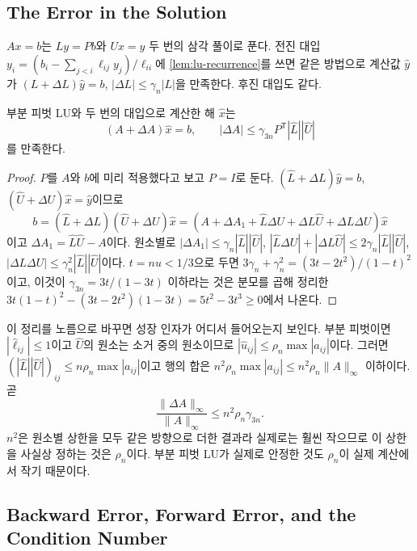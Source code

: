 \subsection{The Error in the Solution}

$Ax=b$는 $Ly=Pb$와 $Ux=y$ 두 번의 삼각 풀이로 푼다. 전진 대입 $y_i=(b_i-\sum_{j<i}\ell_{ij}y_j)/\ell_{ii}$에 \cref{lem:lu-recurrence}를 쓰면 같은 방법으로 계산값 $\hat y$가 $(L+\Delta L)\hat y=b$, $|\Delta L|\le\gamma_n|L|$을 만족한다. 후진 대입도 같다.

\begin{theorem}
\label{thm:lu-solve-backward}
부분 피벗 LU와 두 번의 대입으로 계산한 해 $\hat x$는
\[
(A+\Delta A)\hat x=b,\qquad|\Delta A|\le\gamma_{3n}P^{\mathsf T}|\hat L||\hat U|
\]
를 만족한다.
\end{theorem}

\begin{proof}
$P$를 $A$와 $b$에 미리 적용했다고 보고 $P=I$로 둔다. $(\hat L+\Delta L)\hat y=b$, $(\hat U+\Delta U)\hat x=\hat y$이므로
\[
b=(\hat L+\Delta L)(\hat U+\Delta U)\hat x=(A+\Delta A_1+\hat L\Delta U+\Delta L\hat U+\Delta L\Delta U)\hat x
\]
이고 $\Delta A_1=\hat L\hat U-A$이다. 원소별로 $|\Delta A_1|\le\gamma_n|\hat L||\hat U|$, $|\hat L\Delta U|+|\Delta L\hat U|\le2\gamma_n|\hat L||\hat U|$, $|\Delta L\Delta U|\le\gamma_n^2|\hat L||\hat U|$이다. $t=nu<1/3$으로 두면 $3\gamma_n+\gamma_n^2=(3t-2t^2)/(1-t)^2$이고, 이것이 $\gamma_{3n}=3t/(1-3t)$ 이하라는 것은 분모를 곱해 정리한 $3t(1-t)^2-(3t-2t^2)(1-3t)=5t^2-3t^3\ge0$에서 나온다.
\end{proof}

이 정리를 노름으로 바꾸면 성장 인자가 어디서 들어오는지 보인다. 부분 피벗이면 $|\hat\ell_{ij}|\le1$이고 $\hat U$의 원소는 소거 중의 원소이므로 $|\hat u_{ij}|\le\rho_n\max|a_{ij}|$이다. 그러면 $(|\hat L||\hat U|)_{ij}\le n\rho_n\max|a_{ij}|$이고 행의 합은 $n^2\rho_n\max|a_{ij}|\le n^2\rho_n\|A\|_\infty$ 이하이다. 곧
\begin{equation}
\label{eq:lu-normwise}
\frac{\|\Delta A\|_\infty}{\|A\|_\infty}\le n^2\rho_n\gamma_{3n}.
\end{equation}
$n^2$은 원소별 상한을 모두 같은 방향으로 더한 결과라 실제로는 훨씬 작으므로 이 상한을 사실상 정하는 것은 $\rho_n$이다. 부분 피벗 LU가 실제로 안정한 것도 $\rho_n$이 실제 계산에서 작기 때문이다.

\subsection{Backward Error, Forward Error, and the Condition Number}

